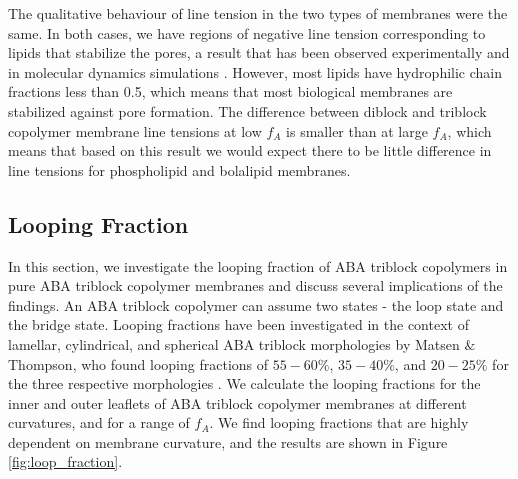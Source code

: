 \documentclass[twocolumn,aps,floatfix,nobibnotes]{revtex4-1}
\begin{document}
The qualitative behaviour of line tension in the two types of membranes were the same. In both cases, we have regions of negative line tension corresponding to lipids that stabilize the pores, a result that has been observed experimentally and in molecular dynamics simulations \cite{karatekin2003cascades,de2006coarse}. However, most lipids have hydrophilic chain fractions less than 0.5, which means that most biological membranes are stabilized against pore formation. The difference between diblock and triblock copolymer membrane line tensions at low $f_A$ is smaller than at large $f_A$, which means that based on this result we would expect there to be little difference in line tensions for phospholipid and bolalipid membranes. 


\subsection{Looping Fraction}

In this section, we investigate the looping fraction of ABA triblock copolymers in pure ABA triblock copolymer membranes and discuss several implications of the findings. An ABA triblock copolymer can assume two states - the loop state and the bridge state. Looping fractions have been investigated in the context of lamellar, cylindrical, and spherical ABA triblock morphologies by Matsen $\&$ Thompson, who found looping fractions of $55 - 60\%$, $35-40\%$, and $20-25\%$ for the three respective morphologies \cite{matsen1999equilibrium}. We calculate the looping fractions for the inner and outer leaflets of ABA triblock copolymer membranes at different curvatures, and for a range of $f_A$. We find looping fractions that are highly dependent on membrane curvature, and the results are shown in Figure \ref{fig:loop_fraction}. 
\end{document}
